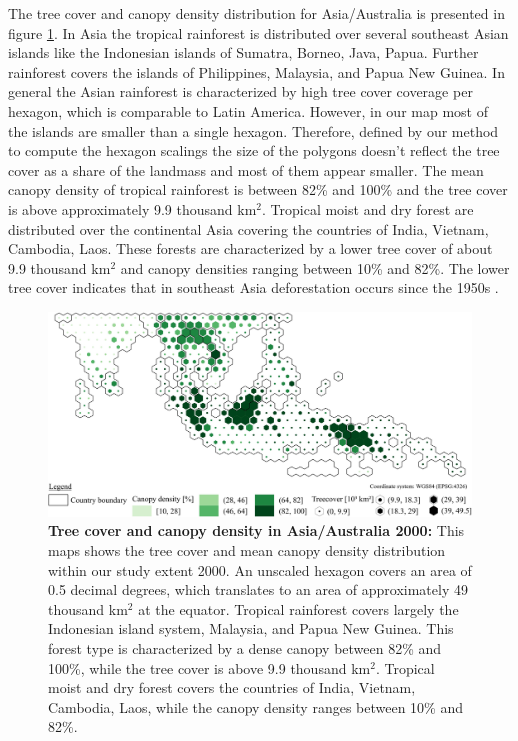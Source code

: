 			The tree cover and canopy density distribution for Asia/Australia is presented in figure \ref{fig:asia_tree_cover}. In Asia the tropical rainforest is distributed over several southeast Asian islands like the Indonesian islands of Sumatra, Borneo, Java, Papua. Further rainforest covers the islands of Philippines, Malaysia, and Papua New Guinea. In general the Asian rainforest is characterized by high tree cover coverage per hexagon, which is comparable to Latin America. However, in our map most of the islands are smaller than a single hexagon. Therefore, defined by our method to compute the hexagon scalings the size of the polygons doesn't reflect the tree cover as a share of the landmass and most of them appear smaller. The mean canopy density of tropical rainforest is between 82\% and 100\% and the tree cover is above approximately 9.9 thousand km$^2$. Tropical moist and dry forest are distributed over the continental Asia covering the countries of India, Vietnam, Cambodia, Laos. These forests are characterized by a lower tree cover of about 9.9 thousand km$^2$ and canopy densities ranging between 10\% and 82\%. The lower tree cover indicates that in southeast Asia deforestation occurs since the 1950s \citep{Kummer1994}. 
			\begin{figure}[ht]
				\centering
				\includegraphics[scale=1.]{img/asia_treecover_frameless}
				\caption[Tree cover and canopy density in Asia/Australia 2000]{\textbf{Tree cover and canopy density in Asia/Australia 2000:} This maps shows the tree cover and mean canopy density distribution within our study extent 2000. An unscaled hexagon covers an area of 0.5 decimal degrees, which translates to an area of approximately 49 thousand km$^2$ at the equator. Tropical rainforest covers largely the Indonesian island system, Malaysia, and Papua New Guinea. This forest type is characterized by a dense canopy between 82\% and 100\%, while the tree cover is above 9.9 thousand km$^2$. Tropical moist and dry forest covers the countries of India, Vietnam, Cambodia, Laos, while the canopy density ranges between 10\% and 82\%.}
				\label{fig:asia_tree_cover}
			\end{figure}

